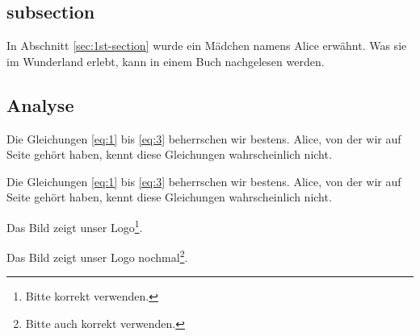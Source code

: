 \documentclass[12pt]{scrartcl}
\begin{document}
\subsection{subsection}
\label{sec:subsection}

In Abschnitt \ref{sec:1st-section} wurde ein Mädchen namens
Alice erwähnt. Was sie im Wunderland erlebt, kann in einem Buch
nachgelesen werden.

\subsection{Analyse}
\label{sec:analyse}

Die Gleichungen \eqref{eq:1} bis \eqref{eq:3} beherrschen wir bestens.
Alice, von der wir auf Seite \pageref{sec:einleitende-worte} gehört
haben, kennt diese Gleichungen wahrscheinlich nicht.

Die Gleichungen \eqref{eq:1} bis \eqref{eq:3} beherrschen wir bestens.
Alice, von der wir auf Seite \pageref{sec:einleitende-worte} gehört
haben, kennt diese Gleichungen wahrscheinlich nicht.


Das Bild zeigt unser Logo\footnote{Bitte korrekt verwenden.}.

Das Bild zeigt unser Logo nochmal\footnote{Bitte auch korrekt verwenden.}.
\end{document}
